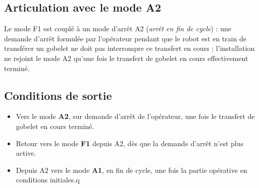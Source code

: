 \subsection{Articulation avec le mode A2}

Le mode F1 est couplé à un mode d'arrêt A2 (\emph{arrêt en fin de cycle}) :
une demande d'arrêt formulée par l'opérateur pendant que le robot est en
train de transférer un gobelet ne doit pas interrompre ce transfert en
cours ; l'installation ne rejoint le mode A2 qu'une fois le transfert de
gobelet en cours effectivement terminé.

\subsection{Conditions de sortie}

\begin{itemize}
    \item Vers le mode \textbf{A2}, sur demande d'arrêt de l'opérateur, une
    fois le transfert de gobelet en cours terminé.
    \item Retour vers le mode \textbf{F1} depuis A2, dès que la demande
    d'arrêt n'est plus active.
    \item Depuis A2 vers le mode \textbf{A1}, en fin de cycle, une fois la partie opérative en conditions initiales.q
\end{itemize}
